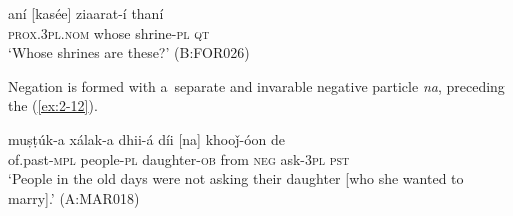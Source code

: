 \begin{exe}
\ex
\label{ex:2-11}
\gll aní [kasée] ziaarat-í thaní \\
	\textsc{prox.3pl.nom} whose shrine-\textsc{pl} \textsc{qt} \\
\glt `Whose shrines are these?' (B:FOR026)
\end{exe}

Negation is formed with a~separate and invarable negative particle \textit{na}, preceding the  (\ref{ex:2-12}).

\begin{exe}
\ex
\label{ex:2-12}
\gll muṣṭúk-a xálak-a dhii-á díi [na] khooǰ-óon de \\
	of.past-\textsc{mpl} people-\textsc{pl} daughter-\textsc{ob} from \textsc{neg} ask-\textsc{3pl} \textsc{pst} \\
\glt `People in the old days were not asking their daughter [who she wanted to marry].' (A:MAR018)
\end{exe}